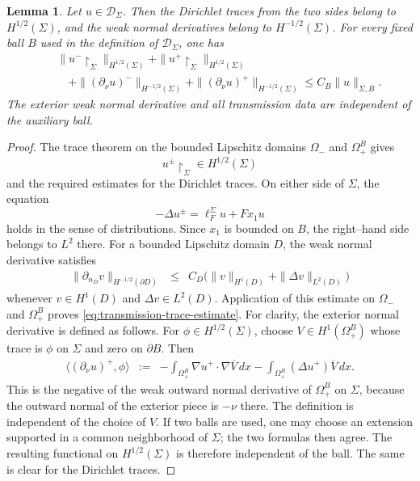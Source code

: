 \documentclass[a4paper,11pt]{article}
\numberwithin{equation}{section}
\newtheorem{lem}{Lemma}[section]
\theoremstyle{remark}
\theoremstyle{definition}
\theoremstyle{remark}
\begin{document}
\begin{lem}\label{lem:transmission-traces}
Let $u\in\mathcal D_\Sigma$.
Then the Dirichlet traces from the two sides belong to $H^{1/2}(\Sigma)$, and the weak normal derivatives belong to $H^{-1/2}(\Sigma)$.
For every fixed ball $B$ used in the definition of $\mathcal D_\Sigma$, one has
\begin{eqnarray}\label{eq:transmission-trace-estimate}
&&
\|u^-\upharpoonright_\Sigma\|_{H^{1/2}(\Sigma)}
+\|u^+\upharpoonright_\Sigma\|_{H^{1/2}(\Sigma)}
\nonumber\\
&&\quad
+\|(\partial_\nu u)^-\|_{H^{-1/2}(\Sigma)}
+\|(\partial_\nu u)^+\|_{H^{-1/2}(\Sigma)}
\le C_B\|u\|_{\Sigma,B}.
\end{eqnarray}
The exterior weak normal derivative and all transmission data are independent of the auxiliary ball.
\end{lem}

\begin{proof}
The trace theorem on the bounded Lipschitz domains $\Omega_-$ and $\Omega_+^B$ gives
$$
u^\pm\upharpoonright_\Sigma\in H^{1/2}(\Sigma)
$$
and the required estimates for the Dirichlet traces.
On either side of $\Sigma$, the equation
$$
-\Delta u^\pm=\ell_F^\Sigma u+Fx_1u
$$
holds in the sense of distributions.
Since $x_1$ is bounded on $B$, the right--hand side belongs to $L^2$ there.
For a bounded Lipschitz domain $D$, the weak normal derivative satisfies
\begin{eqnarray*}
\|\partial_{n_D}v\|_{H^{-1/2}(\partial D)}
&\le&
C_D\bigl(
\|v\|_{H^1(D)}+\|\Delta v\|_{L^2(D)}
\bigr)
\end{eqnarray*}
whenever $v\in H^1(D)$ and $\Delta v\in L^2(D)$.
Application of this estimate on $\Omega_-$ and $\Omega_+^B$ proves \eqref{eq:transmission-trace-estimate}.
For clarity, the exterior normal derivative is defined as follows.
For $\phi\in H^{1/2}(\Sigma)$, choose
$V\in H^1(\Omega_+^B)$ whose trace is $\phi$ on $\Sigma$ and zero on
$\partial B$.
Then
\begin{eqnarray*}
\langle(\partial_\nu u)^+,\phi\rangle
&:=&
-\int_{\Omega_+^B}\nabla u^+\cdot\nabla\overline V\,dx
-\int_{\Omega_+^B}(\Delta u^+)\overline V\,dx.
\end{eqnarray*}
This is the negative of the weak outward normal derivative of
$\Omega_+^B$ on $\Sigma$, because the outward normal of the exterior piece is
$-\nu$ there.
The definition is independent of the choice of $V$.
If two balls are used, one may choose an extension supported in a common
neighborhood of $\Sigma$; the two formulas then agree.
The resulting functional on $H^{1/2}(\Sigma)$ is therefore independent of the
ball.
The same is clear for the Dirichlet traces.
\end{proof}
\end{document}

